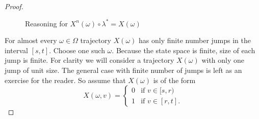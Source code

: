 \begin{proof}
\begin{figure}[h]
\centering
{}
\label{skorochod}
\caption{Reasoning for $X^n(\omega)\circ\lambda^*=X(\omega)$}
\end{figure}

For almost every  $\omega\in\Omega$ trajectory $X(\omega)$ has only finite number jumps in the interval $[s,t]$. Choose one such $\omega$. Because the state space is finite, size of each jump is finite. For clarity we will consider a trajectory $X(\omega)$ with only one jump of unit size. The general case with finite number of jumps is left as an exercise for the reader. So assume that $X(\omega)$ is of the form 
\[X(\omega,v)=\begin{cases}
0 & \text{if $v\in[s,r)$}\\ 
1 & \text{if $v\in[r,t]$}.
\end{cases}\]


\end{proof}
